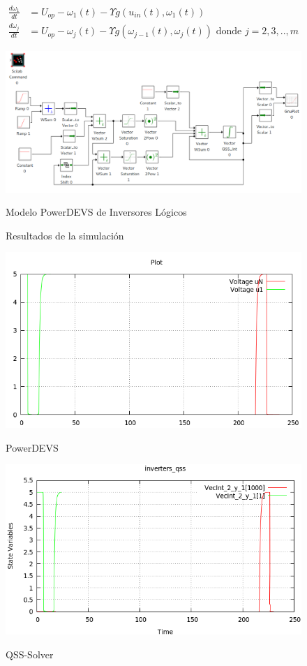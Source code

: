 \begin{align*}
\frac{d \omega_1}{d t} & = U_{op} - \omega_1(t) - \Upsilon g (u_{in}(t), \omega_{1} (t))    \\
\frac{d \omega_j}{d t} & = U_{op} - \omega_j(t) - \Upsilon g (\omega_{j-1}(t), \omega_{j} (t)) \textrm{ donde $j = 2, 3, .., m$}
\end{align*}


\begin{figure}[H]
\includegraphics[width=0.75\linewidth]{inverters}
\label{model:inverters}
\caption{Modelo PowerDEVS de Inversores Lógicos}
\end{figure}

\begin{figure}[H]
\centering
Resultados de la simulación \\
\begin{minipage}{0.5\textwidth}
 \includegraphics[width=\linewidth]{inversers-pd}
\label{graph:inverters-pd}
\caption{PowerDEVS}
\end{minipage}\hfill
\begin{minipage}{0.5\textwidth}
 \includegraphics[width=\linewidth]{inversers-qss}
\label{graph:inverters-qss}
\caption{QSS-Solver}
\end{minipage}
\end{figure}

